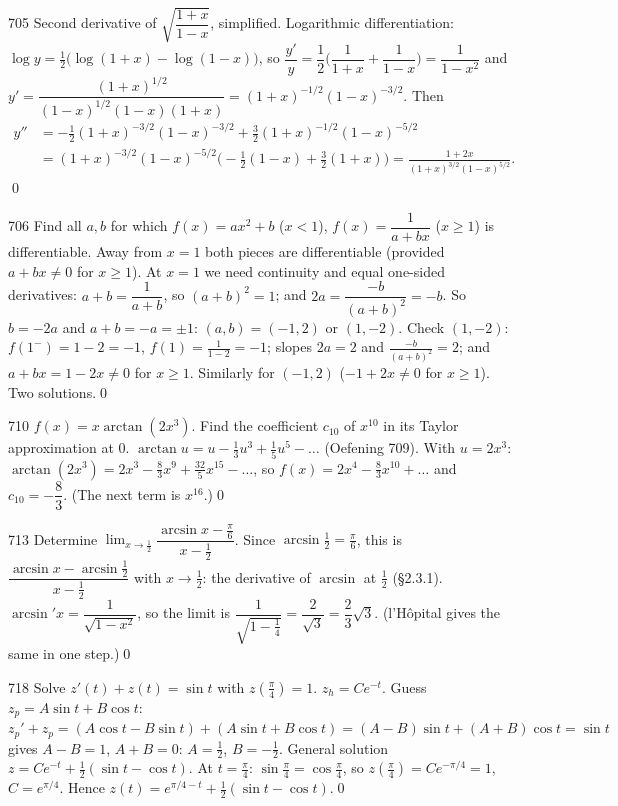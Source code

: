 \begin{bookex}{705}
Second derivative of $\sqrt{\dfrac{1+x}{1-x}}$, simplified.
\solution
Logarithmic differentiation: $\log y=\frac12\big(\log(1+x)-\log(1-x)\big)$, so $\dfrac{y'}y=\dfrac12\Big(\dfrac1{1+x}+\dfrac1{1-x}\Big)=\dfrac1{1-x^2}$ and $y'=\dfrac{(1+x)^{1/2}}{(1-x)^{1/2}(1-x)(1+x)}=(1+x)^{-1/2}(1-x)^{-3/2}$. Then
\begin{align*}
y''&=-\tfrac12(1+x)^{-3/2}(1-x)^{-3/2}+\tfrac32(1+x)^{-1/2}(1-x)^{-5/2}\\
&=(1+x)^{-3/2}(1-x)^{-5/2}\big(-\tfrac12(1-x)+\tfrac32(1+x)\big)=\frac{1+2x}{(1+x)^{3/2}(1-x)^{5/2}}.
\end{align*}\qed
\end{bookex}

\begin{bookex}{706}
Find all $a,b$ for which $f(x)=ax^2+b$ ($x<1$), $f(x)=\dfrac1{a+bx}$ ($x\ge1$) is differentiable.
\solution
Away from $x=1$ both pieces are differentiable (provided $a+bx\ne0$ for $x\ge1$). At $x=1$ we need continuity and equal one-sided derivatives: $a+b=\dfrac1{a+b}$, so $(a+b)^2=1$; and $2a=\dfrac{-b}{(a+b)^2}=-b$. So $b=-2a$ and $a+b=-a=\pm1$: $(a,b)=(-1,2)$ or $(1,-2)$. Check $(1,-2)$: $f(1^-)=1-2=-1$, $f(1)=\frac1{1-2}=-1$; slopes $2a=2$ and $\frac{-b}{(a+b)^2}=2$; and $a+bx=1-2x\ne0$ for $x\ge1$. Similarly for $(-1,2)$ ($-1+2x\ne0$ for $x\ge1$). Two solutions.\qed
\end{bookex}

\begin{bookex}{710}
$f(x)=x\arctan(2x^3)$. Find the coefficient $c_{10}$ of $x^{10}$ in its Taylor approximation at $0$.
\solution
$\arctan u=u-\frac13u^3+\frac15u^5-\dots$ (Oefening 709). With $u=2x^3$: $\arctan(2x^3)=2x^3-\frac83x^9+\frac{32}5x^{15}-\dots$, so $f(x)=2x^4-\frac83x^{10}+\dots$ and $c_{10}=-\dfrac83$. (The next term is $x^{16}$.)\qed
\end{bookex}

\begin{bookex}{713}
Determine $\lim_{x\to\frac12}\dfrac{\arcsin x-\frac\pi6}{x-\frac12}$.
\solution
Since $\arcsin\frac12=\frac\pi6$, this is $\dfrac{\arcsin x-\arcsin\frac12}{x-\frac12}$ with $x\to\frac12$: the derivative of $\arcsin$ at $\frac12$ (\S2.3.1). $\arcsin'x=\dfrac1{\sqrt{1-x^2}}$, so the limit is $\dfrac1{\sqrt{1-\frac14}}=\dfrac2{\sqrt3}=\dfrac23\sqrt3$. (l'H\^opital gives the same in one step.)\qed
\end{bookex}

\begin{bookex}{718}
Solve $z'(t)+z(t)=\sin t$ with $z(\frac\pi4)=1$.
\solution
$z_h=Ce^{-t}$. Guess $z_p=A\sin t+B\cos t$: $z_p'+z_p=(A\cos t-B\sin t)+(A\sin t+B\cos t)=(A-B)\sin t+(A+B)\cos t=\sin t$ gives $A-B=1$, $A+B=0$: $A=\frac12$, $B=-\frac12$. General solution $z=Ce^{-t}+\frac12(\sin t-\cos t)$. At $t=\frac\pi4$: $\sin\frac\pi4=\cos\frac\pi4$, so $z(\frac\pi4)=Ce^{-\pi/4}=1$, $C=e^{\pi/4}$. Hence $z(t)=e^{\pi/4-t}+\frac12(\sin t-\cos t)$.\qed
\end{bookex}

